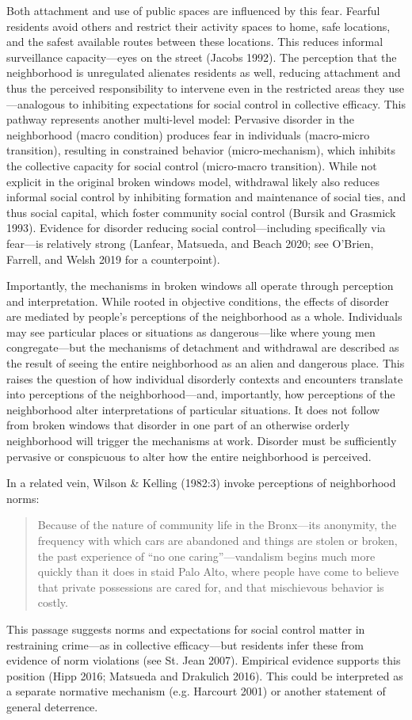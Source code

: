 \documentclass [11pt, proquest] {uwthesis}[2015/03/03]
\begin{document}
Both attachment and use of public spaces are influenced by this fear. Fearful residents avoid others and restrict their activity spaces to home, safe locations, and the safest available routes between these locations. This reduces informal surveillance capacity---eyes on the street (Jacobs 1992). The perception that the neighborhood is unregulated alienates residents as well, reducing attachment and thus the perceived responsibility to intervene even in the restricted areas they use---analogous to inhibiting expectations for social control in collective efficacy. This pathway represents another multi-level model: Pervasive disorder in the neighborhood (macro condition) produces fear in individuals (macro-micro transition), resulting in constrained behavior (micro-mechanism), which inhibits the collective capacity for social control (micro-macro transition). While not explicit in the original broken windows model, withdrawal likely also reduces informal social control by inhibiting formation and maintenance of social ties, and thus social capital, which foster community social control (Bursik and Grasmick 1993). Evidence for disorder reducing social control---including specifically via fear---is relatively strong (Lanfear, Matsueda, and Beach 2020; see O'Brien, Farrell, and Welsh 2019 for a counterpoint).

Importantly, the mechanisms in broken windows all operate through perception and interpretation. While rooted in objective conditions, the effects of disorder are mediated by people's perceptions of the neighborhood as a whole. Individuals may see particular places or situations as dangerous---like where young men congregate---but the mechanisms of detachment and withdrawal are described as the result of seeing the entire neighborhood as an alien and dangerous place. This raises the question of how individual disorderly contexts and encounters translate into perceptions of the neighborhood---and, importantly, how perceptions of the neighborhood alter interpretations of particular situations. It does not follow from broken windows that disorder in one part of an otherwise orderly neighborhood will trigger the mechanisms at work. Disorder must be sufficiently pervasive or conspicuous to alter how the entire neighborhood is perceived.

In a related vein, Wilson \& Kelling (1982:3) invoke perceptions of neighborhood norms:
\begin{quote}
Because of the nature of community life in the Bronx---its anonymity, the frequency with which cars are abandoned and things are stolen or broken, the past experience of ``no one caring''---vandalism begins much more quickly than it does in staid Palo Alto, where people have come to believe that private possessions are cared for, and that mischievous behavior is costly.
\end{quote}
This passage suggests norms and expectations for social control matter in restraining crime---as in collective efficacy---but residents infer these from evidence of norm violations (see St. Jean 2007). Empirical evidence supports this position (Hipp 2016; Matsueda and Drakulich 2016). This could be interpreted as a separate normative mechanism (e.g. Harcourt 2001) or another statement of general deterrence.
\end{document}
